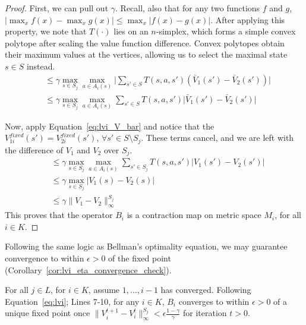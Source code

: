 \begin{proof}
First, we can pull out $\gamma$. Recall, also that for any two functions $f$ and $g$, $| \max_x f(x) - \max_x g(x) | \leq \max_x | f(x) - g(x) |$. After applying this property, we note that $T(\cdot)$ lies on an $n$-simplex, which forms a simple convex polytope after scaling the value function difference. Convex polytopes obtain their maximum values at the vertices, allowing us to select the maximal state $s \in S$ instead.
\begin{align*}
    &\leq \gamma \max_{s \in S_j} \max_{a \in A_i(s)} \Big| \sum_{s' \in S} T(s, a, s') (\bar{V}_1(s') - \bar{V}_2(s')) \Big| \\
    &\leq \gamma \max_{s \in S_j} \max_{a \in A_i(s)} \sum_{s' \in S} T(s, a, s') \Big| \bar{V}_1(s') - \bar{V}_2(s') \Big|
\end{align*}

Now, apply Equation~\ref{eq:lvi_V_bar} and notice that the $V_{1i}^{fixed}(s') = V_{2i}^{fixed}(s')$, $\forall s' \in S \setminus S_j$. These terms cancel, and we are left with the difference of $V_1$ and $V_2$ over $S_j$.
\begin{align*}
    &\leq \gamma \max_{s \in S_j} \max_{a \in A_i(s)} \sum_{s' \in S_j} T(s, a, s') \Big| V_1(s') - V_2(s') \Big| \\
    &\leq \gamma \max_{s \in S_j} \Big| V_1(s) - V_2(s) \Big| \\
    &\leq \gamma \| V_1 - V_2 \|_\infty^{S_j}
\end{align*}
This proves that the operator $B_i$ is a contraction map on metric space $M_i$, for all $i \in K$.
\end{proof}

Following the same logic as Bellman's optimality equation, we may guarantee convergence to within $\epsilon > 0$ of the fixed point (Corollary~\ref{cor:lvi_eta_convergence_check}).

\begin{proposition}
    \label{cor:lvi_eta_convergence_check}
    For all $j \in L$, for $i \in K$, assume $1, \ldots, i - 1$ has converged. Following Equation~\ref{eq:lvi}; Lines 7-10, for any $i \in K$, $B_i$ converges to within $\epsilon > 0$ of a unique fixed point once $\| V_i^{t+1} - V_i^t \|_\infty^{S_j} < \epsilon \frac{1 - \gamma}{\gamma}$ for iteration $t > 0$.
\end{proposition}

